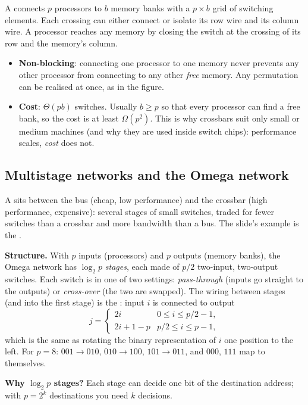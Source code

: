 A  connects $p$ processors to $b$ memory banks with a $p\times b$ grid of switching elements. Each crossing can
either connect or isolate its row wire and its column wire. A processor reaches any memory by closing the switch at the crossing of its row and the
memory's column.

\begin{itemize}
  \item \textbf{Non-blocking}: connecting one processor to one memory never prevents any other processor from connecting to any other \emph{free} memory. Any permutation can be realised at once, as in the figure.
  \item \textbf{Cost}: $\Theta(pb)$ switches. Usually $b\ge p$ so that every processor can find a free bank, so the cost is at least $\Omega(p^{2})$.
        This is why crossbars suit only small or medium machines (and why they are used inside switch chips): performance scales,
        \emph{cost} does not.
\end{itemize}

\subsection{Multistage networks and the Omega network}

A  sits between the bus (cheap, low performance) and the crossbar (high performance, expensive): several stages of small
switches, traded for fewer switches than a crossbar and more bandwidth than a bus. The slide's example is the .

\textbf{Structure.} With $p$ inputs (processors) and $p$ outputs (memory banks), the Omega network has $\log_2 p$ \emph{stages}, each made of $p/2$
two-input, two-output switches. Each switch is in one of two settings: \emph{pass-through} (inputs go straight to the outputs) or \emph{cross-over}
(the two are swapped). The wiring between stages (and into the first stage) is the : input $i$ is connected to output
\[
  j = \begin{cases} 2i & 0\le i\le p/2-1,\\ 2i+1-p & p/2\le i\le p-1,\end{cases}
\]
which is the same as rotating the binary representation of $i$ one position to the left. For $p=8$: $001\to010$, $010\to100$,
$101\to011$, and $000$, $111$ map to themselves.

\textbf{Why $\log_2 p$ stages?} Each stage can decide one bit of the destination address; with $p=2^k$ destinations you need $k$ decisions.

